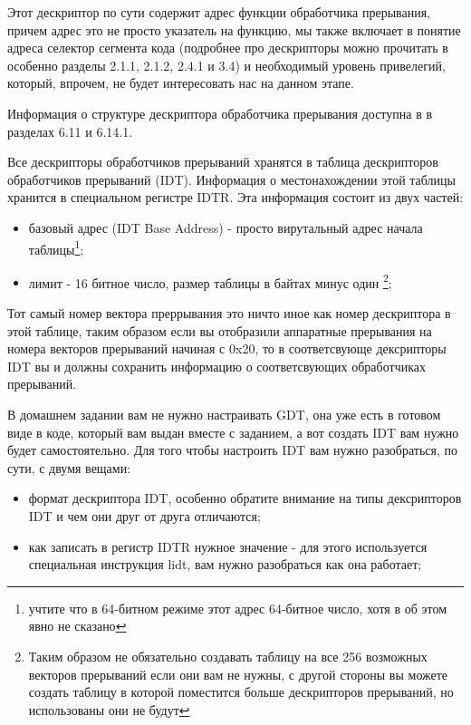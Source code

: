 Этот дескриптор по сути содержит адрес функции обработчика прерывания, причем
адрес это не просто указатель на функцию, мы также включает в понятие адреса
селектор сегмента кода (подробнее про дескрипторы можно прочитать в
\cite{INTEL:SYSV3} особенно разделы 2.1.1, 2.1.2, 2.4.1 и 3.4) и необходимый
уровень привелегий, который, впрочем, не будет интересовать нас на данном этапе.

Информация о структуре дескриптора обработчика прерывания доступна в
\cite{INTEL:SYSV3} в разделах 6.11 и 6.14.1.

Все дескрипторы обработчиков прерываний хранятся в таблица дескрипторов
обработчиков прерываний (IDT). Информация о местонахождении этой таблицы
хранится в специальном регистре IDTR. Эта информация состоит из двух частей:
\begin{itemize}
  \item базовый адрес (IDT Base Address) - просто вирутальный адрес начала
        таблицы\footnote{учтите что в 64-битном режиме этот адрес 64-битное
        число, хотя в \cite{INTEL:SYSV3} об этом явно не сказано};
  \item лимит - 16 битное число, размер таблицы в байтах минус один
        \footnote{Таким образом не обязательно создавать таблицу на все 256
        возможных векторов прерываний если они вам не нужны, с другой стороны
        вы можете создать таблицу в которой поместится больше дескрипторов
        прерываний, но использованы они не будут};
\end{itemize}

Тот самый номер вектора преррывания это ничто иное как номер дескриптора в этой
таблице, таким образом если вы отобразили аппаратные прерывания на номера
векторов прерываний начиная с 0x20, то в соответсвующе дексрипторы IDT вы и
должны сохранить информацию о соответсвующих обработчиках прерываний.

В домашнем задании вам не нужно настраивать GDT, она уже есть в готовом виде в
коде, который вам выдан вместе с заданием, а вот создать IDT вам нужно будет
самостоятельно. Для того чтобы настроить IDT вам нужно разобраться, по сути,
с двумя вещами:
\begin{itemize}
  \item формат дескриптора IDT, особенно обратите внимание на типы дексрипторов
        IDT и чем они друг от друга отличаются;
  \item как записать в регистр IDTR нужное значение - для этого используется
        специальная инструкция lidt, вам нужно разобраться как она работает;
\end{itemize}

